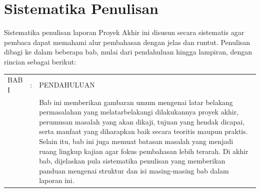 \section{Sistematika Penulisan}

Sistematika penulisan laporan Proyek Akhir ini disusun secara sistematis agar pembaca dapat memahami alur pembahasan dengan jelas dan runtut. Penulisan dibagi ke dalam beberapa bab, mulai dari pendahuluan hingga lampiran, dengan rincian sebagai berikut:

\begin{longtable}{@{}llp{11cm}@{}}
    BAB I          & : & PENDAHULUAN                                                                                                                                                                                                                                                                                                                                                                                                                                                                                                                                                                                                                                                                                                                                                                                    \\
                   &   & Bab ini memberikan gambaran umum mengenai latar belakang permasalahan yang melatarbelakangi dilakukannya proyek akhir, perumusan masalah yang akan dikaji, tujuan yang hendak dicapai, serta manfaat yang diharapkan baik secara teoritis maupun praktis. Selain itu, bab ini juga memuat batasan masalah yang menjadi ruang lingkup kajian agar fokus pembahasan lebih terarah. Di akhir bab, dijelaskan pula sistematika penulisan yang memberikan panduan mengenai struktur dan isi masing-masing bab dalam laporan ini.                                                                                                                                                                                                                                                                    \\[0.8em]


\end{longtable}

